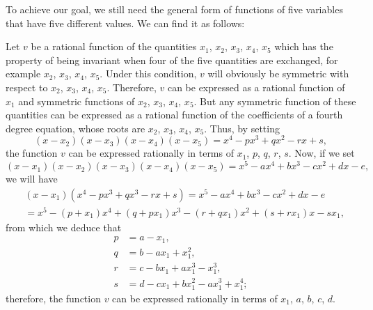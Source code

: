 \documentclass[oneside, 12 pt, leqno]{memoir}
\begin{document}
To achieve our goal, we still need the general form of functions of five variables that have five different values. We can find it as follows:

Let \(v\) be a rational function of the quantities \(x_1\), \(x_2\), \(x_3\), \(x_4\), \(x_5\) which has the property of being invariant when four of the five quantities are exchanged, for example \(x_2\), \(x_3\), \(x_4\), \(x_5\). Under this condition, \(v\) will obviously be symmetric with respect to \(x_2\), \(x_3\), \(x_4\), \(x_5\). Therefore, \(v\) can be expressed as a rational function of \(x_1\) and symmetric functions of \(x_2\), \(x_3\), \(x_4\), \(x_5\). But any symmetric function of these quantities can be expressed as a rational function of the coefficients of a fourth degree equation, whose roots are \(x_2\), \(x_3\), \(x_4\), \(x_5\). Thus, by setting
\[\left(x-x_2\right)\left(x-x_3\right)\left(x-x_4\right)\left(x-x_5\right)=x^4-p x^3+q x^2-r x+s,\]
the function \(v\) can be expressed rationally in terms of \(x_1\), \(p\), \(q\), \(r\), \(s\). Now, if we set
\[\left(x-x_1\right)\left(x-x_2\right)\left(x-x_3\right)\left(x-x_4\right)\left(x-x_5\right)=x^5-a x^4+b x^3-c x^2+d x-e,\]
we will have
\[\begin{aligned}
& \left(x-x_1\right)\left(x^4-p x^3+q x^3-r x+s\right)=x^5-a x^4+b x^3-c x^2+d x-e \\
& =x^5-\left(p+x_1\right) x^4+\left(q+p x_1\right) x^3-\left(r+q x_1\right) x^2+\left(s+r x_1\right) x-s x_1,
\end{aligned}\]
from which we deduce that
\[\begin{aligned}
p & =a-x_1, \\
q & =b-a x_1+x_1^2, \\
r & =c-b x_1+a x_1^3-x_1^3, \\
 s & =d-c x_1+b x_1^2-a x_1^3+x_1^4;
\end{aligned}\]
therefore, the function \(v\) can be expressed rationally in terms of \(x_1\), \(a\), \(b\), \(c\), \(d\).
\end{document}
